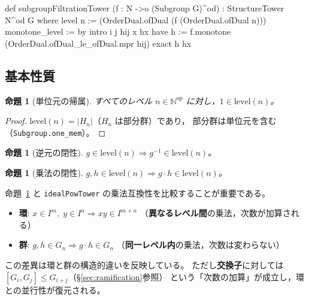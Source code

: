 \documentclass[a4paper,11pt]{ltjsarticle}
\theoremstyle{definition}
\theoremstyle{plain}
\newtheorem{proposition}[definition]{命題}
\theoremstyle{remark}
\begin{document}
\begin{leancode}
def subgroupFiltrationTower (f : N ->o (Subgroup G)^od) :
    StructureTower N^od G where
  level n := (OrderDual.ofDual (f (OrderDual.ofDual n)))
  monotone_level := by
    intro i j hij x hx
    have h := f.monotone (OrderDual.ofDual_le_ofDual.mpr hij)
    exact h hx
\end{leancode}

\subsection{基本性質}

\begin{proposition}[単位元の帰属]\label{prop:one-mem}
  すべてのレベル $n \in \mathbb{N}^{\mathrm{op}}$ に対し，$1 \in \mathrm{level}(n)$。
\end{proposition}

\begin{proof}
  $\mathrm{level}(n) = \lvert H_n \rvert$（$H_n$ は部分群）であり，
  部分群は単位元を含む（\texttt{Subgroup.one\_mem}）。
\end{proof}

\begin{proposition}[逆元の閉性]\label{prop:inv-mem}
  $g \in \mathrm{level}(n) \Rightarrow g^{-1} \in \mathrm{level}(n)$。
\end{proposition}

\begin{proposition}[乗法の閉性]\label{prop:mul-mem}
  $g, h \in \mathrm{level}(n) \Rightarrow g \cdot h \in \mathrm{level}(n)$。
\end{proposition}

\begin{mathinsight}
命題~\ref{prop:mul-mem} と \texttt{idealPowTower} の乗法互換性を比較することが重要である。
\begin{itemize}
  \item \textbf{環}: $x \in I^m,\;y \in I^n \Rightarrow xy \in I^{m+n}$
    （\textbf{異なるレベル間}の乗法，次数が加算される）
  \item \textbf{群}: $g,h \in G_n \Rightarrow g \cdot h \in G_n$
    （\textbf{同一レベル内}の乗法，次数は変わらない）
\end{itemize}
この差異は環と群の構造的違いを反映している。
ただし\textbf{交換子}に対しては $[G_i,G_j] \leq G_{i+j}$（§\ref{sec:ramification}参照）
という「次数の加算」が成立し，環との並行性が復元される。
\end{mathinsight}
\end{document}
